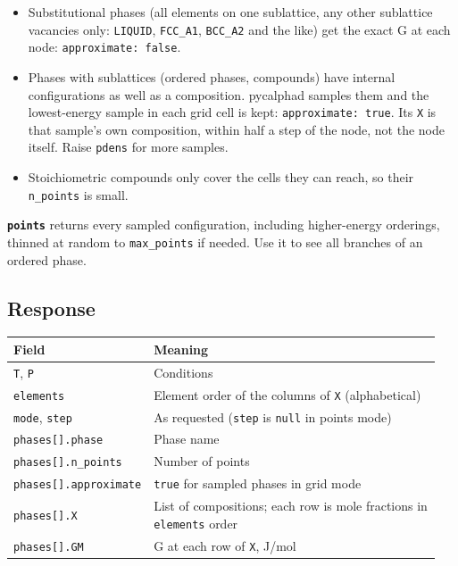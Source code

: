 \documentclass[12pt,a4paper]{article}
\begin{document}
\begin{itemize}
\item Substitutional phases (all elements on one sublattice, any other sublattice vacancies only: \texttt{LIQUID}, \texttt{FCC\_\allowbreak{}A1}, \texttt{BCC\_\allowbreak{}A2} and the like) get the exact G at each node: \texttt{\textquotedbl{}approximate\textquotedbl{}: false}.
\item Phases with sublattices (ordered phases, compounds) have internal configurations as well as a composition. pycalphad samples them and the lowest-energy sample in each grid cell is kept: \texttt{\textquotedbl{}approximate\textquotedbl{}: true}. Its \texttt{X} is that sample's own composition, within half a step of the node, not the node itself. Raise \texttt{pdens} for more samples.
\item Stoichiometric compounds only cover the cells they can reach, so their \texttt{n\_\allowbreak{}points} is small.
\end{itemize}
\textbf{\texttt{points}} returns every sampled configuration, including higher-energy orderings, thinned at random to \texttt{max\_\allowbreak{}points} if needed. Use it to see all branches of an ordered phase.


\subsection*{Response}
\begingroup\small
\begin{longtable}{>{\raggedright\arraybackslash}p{0.235\linewidth}>{\raggedright\arraybackslash}p{0.712\linewidth}}
\toprule
\textbf{Field} & \textbf{Meaning} \\
\midrule
\endhead
\texttt{T}, \texttt{P} & Conditions \\
\texttt{elements} & Element order of the columns of \texttt{X} (alphabetical) \\
\texttt{mode}, \texttt{step} & As requested (\texttt{step} is \texttt{null} in points mode) \\
\texttt{phases[].\allowbreak{}phase} & Phase name \\
\texttt{phases[].\allowbreak{}n\_\allowbreak{}points} & Number of points \\
\texttt{phases[].\allowbreak{}approximate} & \texttt{true} for sampled phases in grid mode \\
\texttt{phases[].\allowbreak{}X} & List of compositions; each row is mole fractions in \texttt{elements} order \\
\texttt{phases[].\allowbreak{}GM} & G at each row of \texttt{X}, J/mol \\
\bottomrule
\end{longtable}
\endgroup
\end{document}
